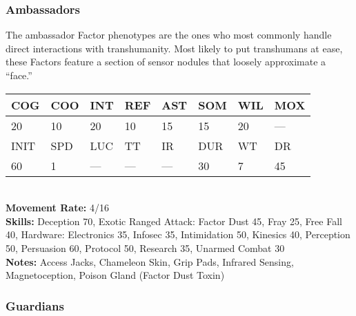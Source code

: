 \subsubsection{Ambassadors} The ambassador Factor phenotypes are the ones who most commonly handle direct interactions with transhumanity. Most likely to put transhumans at ease, these Factors feature a section of sensor nodules that loosely approximate a ``face.'' \\ \begin{tabular}{|l|l|l|l|l|l|l|l|} \hline

COG &COO &INT &REF &AST &SOM &WIL &MOX \\ \hline

20 &10 &20 &10 &15 &15 &20 &— \\ \hline

INIT &SPD &LUC &TT &IR &DUR &WT &DR \\ \hline

60 &1 &— &— &— &30 &7 &45 \\ \hline

\end{tabular} \\ \textbf{Movement Rate: }4/16 \\ \textbf{Skills:} Deception 70, Exotic Ranged Attack: Factor Dust 45, Fray 25, Free Fall 40, Hardware: Electronics 35, Infosec 35, Intimidation 50, Kinesics 40, Perception 50, Persuasion 60, Protocol 50, Research 35, Unarmed Combat 30 \\ \textbf{Notes: }Access Jacks, Chameleon Skin, Grip Pads, Infrared Sensing, Magnetoception, Poison Gland (Factor Dust Toxin) 



\subsubsection{Guardians} 

